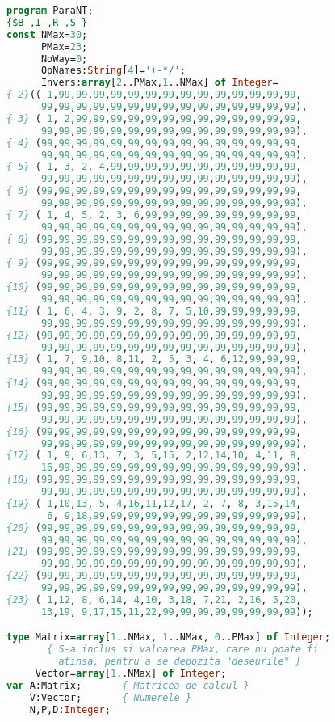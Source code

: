 \begin{lstlisting}[language=Pascal]
program ParaNT;
{$B-,I-,R-,S-}
const NMax=30;
      PMax=23;
      NoWay=0;
      OpNames:String[4]='+-*/';
      Invers:array[2..PMax,1..NMax] of Integer=
{ 2}(( 1,99,99,99,99,99,99,99,99,99,99,99,99,99,99,
      99,99,99,99,99,99,99,99,99,99,99,99,99,99,99),
{ 3} ( 1, 2,99,99,99,99,99,99,99,99,99,99,99,99,99,
      99,99,99,99,99,99,99,99,99,99,99,99,99,99,99),
{ 4} (99,99,99,99,99,99,99,99,99,99,99,99,99,99,99,
      99,99,99,99,99,99,99,99,99,99,99,99,99,99,99),
{ 5} ( 1, 3, 2, 4,99,99,99,99,99,99,99,99,99,99,99,
      99,99,99,99,99,99,99,99,99,99,99,99,99,99,99),
{ 6} (99,99,99,99,99,99,99,99,99,99,99,99,99,99,99,
      99,99,99,99,99,99,99,99,99,99,99,99,99,99,99),
{ 7} ( 1, 4, 5, 2, 3, 6,99,99,99,99,99,99,99,99,99,
      99,99,99,99,99,99,99,99,99,99,99,99,99,99,99),
{ 8} (99,99,99,99,99,99,99,99,99,99,99,99,99,99,99,
      99,99,99,99,99,99,99,99,99,99,99,99,99,99,99),
{ 9} (99,99,99,99,99,99,99,99,99,99,99,99,99,99,99,
      99,99,99,99,99,99,99,99,99,99,99,99,99,99,99),
{10} (99,99,99,99,99,99,99,99,99,99,99,99,99,99,99,
      99,99,99,99,99,99,99,99,99,99,99,99,99,99,99),
{11} ( 1, 6, 4, 3, 9, 2, 8, 7, 5,10,99,99,99,99,99,
      99,99,99,99,99,99,99,99,99,99,99,99,99,99,99),
{12} (99,99,99,99,99,99,99,99,99,99,99,99,99,99,99,
      99,99,99,99,99,99,99,99,99,99,99,99,99,99,99),
{13} ( 1, 7, 9,10, 8,11, 2, 5, 3, 4, 6,12,99,99,99,
      99,99,99,99,99,99,99,99,99,99,99,99,99,99,99),
{14} (99,99,99,99,99,99,99,99,99,99,99,99,99,99,99,
      99,99,99,99,99,99,99,99,99,99,99,99,99,99,99),
{15} (99,99,99,99,99,99,99,99,99,99,99,99,99,99,99,
      99,99,99,99,99,99,99,99,99,99,99,99,99,99,99),
{16} (99,99,99,99,99,99,99,99,99,99,99,99,99,99,99,
      99,99,99,99,99,99,99,99,99,99,99,99,99,99,99),
{17} ( 1, 9, 6,13, 7, 3, 5,15, 2,12,14,10, 4,11, 8,
      16,99,99,99,99,99,99,99,99,99,99,99,99,99,99),
{18} (99,99,99,99,99,99,99,99,99,99,99,99,99,99,99,
      99,99,99,99,99,99,99,99,99,99,99,99,99,99,99),
{19} ( 1,10,13, 5, 4,16,11,12,17, 2, 7, 8, 3,15,14,
       6, 9,18,99,99,99,99,99,99,99,99,99,99,99,99),
{20} (99,99,99,99,99,99,99,99,99,99,99,99,99,99,99,
      99,99,99,99,99,99,99,99,99,99,99,99,99,99,99),
{21} (99,99,99,99,99,99,99,99,99,99,99,99,99,99,99,
      99,99,99,99,99,99,99,99,99,99,99,99,99,99,99),
{22} (99,99,99,99,99,99,99,99,99,99,99,99,99,99,99,
      99,99,99,99,99,99,99,99,99,99,99,99,99,99,99),
{23} ( 1,12, 8, 6,14, 4,10, 3,18, 7,21, 2,16, 5,20,
      13,19, 9,17,15,11,22,99,99,99,99,99,99,99,99));

type Matrix=array[1..NMax, 1..NMax, 0..PMax] of Integer;
       { S-a inclus si valoarea PMax, care nu poate fi
         atinsa, pentru a se depozita "deseurile" }
     Vector=array[1..NMax] of Integer;
var A:Matrix;       { Matricea de calcul }
    V:Vector;       { Numerele }
    N,P,D:Integer;


\end{lstlisting}
